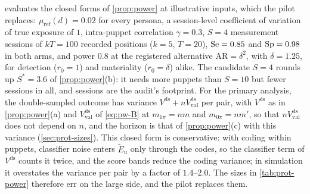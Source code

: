  evaluates the closed forms of \cref{prop:power} at illustrative inputs, which the pilot replaces: $\mu_{\mathrm{ref}}(d)=0.02$ for every persona, a session-level coefficient of variation of true exposure of $1$, intra-puppet correlation $\gamma=0.3$, $S=4$ measurement sessions of $kT=100$ recorded positions ($k=5$, $T=20$), $\mathrm{Se}=0.85$ and $\mathrm{Sp}=0.98$ in both arms, and power $0.8$ at the registered alternative $\mathrm{AR}=\delta^2$, with $\delta=1.25$, for detection ($r_0=1$) and materiality ($r_0=\delta$) alike. The candidate $S=4$ rounds up $S^\ast=3.6$ of \cref{prop:power}(b): it needs more puppets than $S=10$ but fewer sessions in all, and sessions are the audit's footprint. For the primary analysis, the double-sampled outcome has variance $V^{\mathrm{ds}}+nV_{\mathrm{val}}^{\mathrm{ds}}$ per pair, with $V^{\mathrm{ds}}$ as in \cref{prop:power}(a) and $V_{\mathrm{val}}^{\mathrm{ds}}$ of \eqref{eq:pw-B} at $m_{1\pi}=nm$ and $m_{0\pi}=nm'$, so that $nV_{\mathrm{val}}^{\mathrm{ds}}$ does not depend on $n$, and the horizon is that of \cref{prop:power}(c) with this variance (\cref{sec:prot-sizes}).
This closed form is conservative: with coding within puppets, classifier noise enters $\widetilde E_u$ only through the codes, so the classifier term of $V^{\mathrm{ds}}$ counts it twice, and the score bands reduce the coding variance; in simulation it overstates the variance per pair by a factor of $1.4$--$2.0$. The sizes in \cref{tab:prot-power} therefore err on the large side, and the pilot replaces them.

